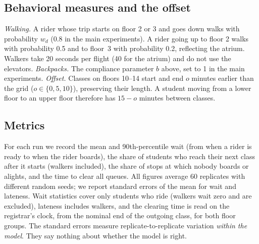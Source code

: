 \subsection{Behavioral measures and the offset}

\emph{Walking.} A rider whose trip starts on floor 2 or 3 and goes down walks with probability $w_d$ (0.8 in the
main experiments). A rider going up to floor 2 walks with probability 0.5 and to floor~3 with probability 0.2,
reflecting the atrium. Walkers take 20 seconds per flight (40 for the atrium) and do not use the elevators.
\emph{Backpacks.} The compliance parameter $b$ above, set to 1 in the main experiments. \emph{Offset.}
Classes on floors 10--14 start and end $o$ minutes earlier than the grid ($o\in\{0,5,10\}$), preserving their
length. A student moving from a lower floor to an upper floor therefore has $15-o$ minutes between classes.

\subsection{Metrics}

For each run we record the mean and 90th-percentile wait (from when a rider is ready to when the rider boards),
the share of students who reach their next class after it starts (walkers included), the share of stops at
which nobody boards or alights, and the time to clear all queues. All figures average 60 replicates with
different random seeds; we report standard errors of the mean for wait and lateness. Wait statistics cover only
students who ride (walkers wait zero and are excluded), lateness includes walkers, and the clearing time is read on
the registrar's clock, from the nominal end of the outgoing class, for both floor groups. The standard errors
measure replicate-to-replicate variation \emph{within the model}. They say nothing about whether the model is
right.


